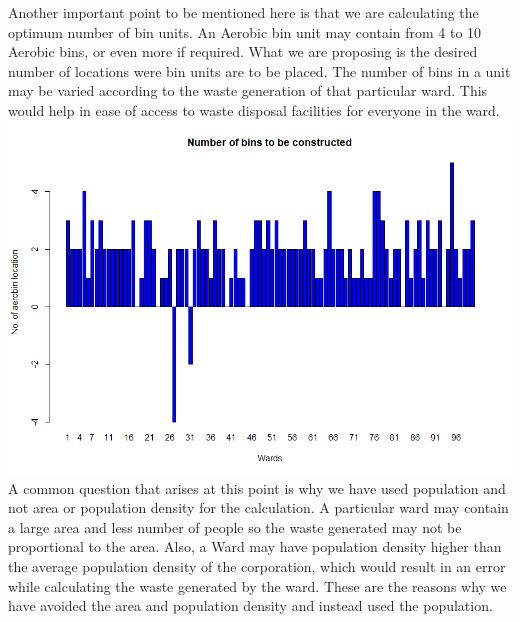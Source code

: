 \documentclass[12pt,a4paper]{report}
\begin{document}
\begin{justify}
	Another important point to be mentioned here is that we are calculating the optimum number of bin units. An Aerobic bin unit may contain from 4 to 10 Aerobic bins, or even more if required. What we are proposing is the desired number of locations were bin units are to be placed. The number of bins in a unit may be varied according to the waste generation of that particular ward. This would help in ease of access to waste disposal facilities for everyone in the ward.
	\includegraphics[width=1\textwidth]{construc}
	A common question that arises at this point is why we have used population and not area or population density for the calculation. A particular ward may contain a large area and less number of people so the waste generated may not be proportional to the area. Also, a Ward may have population density higher than the average population density of the corporation, which would result in an error while calculating the waste generated by the ward. These are the reasons why we have avoided the area and population density and instead used the population.
	
\end{justify}
\end{document}
